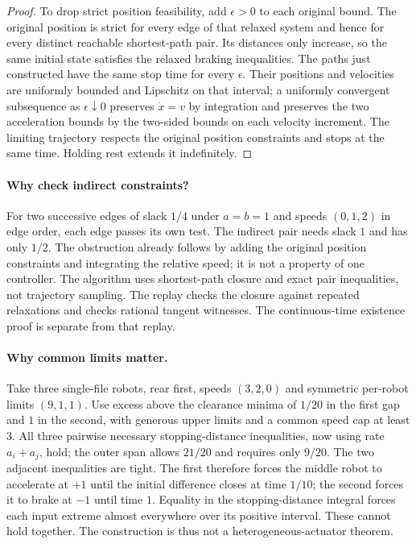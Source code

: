 \documentclass[11pt]{article}
\begin{document}
\begin{proof}
To drop strict position feasibility, add $\epsilon>0$ to each original bound. The original position is strict for every edge of that relaxed system and hence for every distinct reachable shortest-path pair. Its distances only increase, so the same initial state satisfies the relaxed braking inequalities. The paths just constructed have the same stop time for every $\epsilon$. Their positions and velocities are uniformly bounded and Lipschitz on that interval; a uniformly convergent subsequence as $\epsilon\downarrow0$ preserves $\dot x=v$ by integration and preserves the two acceleration bounds by the two-sided bounds on each velocity increment. The limiting trajectory respects the original position constraints and stops at the same time. Holding rest extends it indefinitely.
\end{proof}

\paragraph{Why check indirect constraints?}
For two successive edges of slack $1/4$ under $a=b=1$ and speeds $(0,1,2)$ in edge order, each edge passes its own test. The indirect pair needs slack $1$ and has only $1/2$. The obstruction already follows by adding the original position constraints and integrating the relative speed; it is not a property of one controller. The algorithm uses shortest-path closure and exact pair inequalities, not trajectory sampling. The replay checks the closure against repeated relaxations and checks rational tangent witnesses. The continuous-time existence proof is separate from that replay.

\paragraph{Why common limits matter.}
Take three single-file robots, rear first, speeds $(3,2,0)$ and symmetric per-robot limits $(9,1,1)$. Use excess above the clearance minima of $1/20$ in the first gap and $1$ in the second, with generous upper limits and a common speed cap at least $3$. All three pairwise necessary stopping-distance inequalities, now using rate $a_i+a_j$, hold; the outer span allows $21/20$ and requires only $9/20$. The two adjacent inequalities are tight. The first therefore forces the middle robot to accelerate at $+1$ until the initial difference closes at time $1/10$; the second forces it to brake at $-1$ until time $1$. Equality in the stopping-distance integral forces each input extreme almost everywhere over its positive interval. These cannot hold together. The construction is thus not a heterogeneous-actuator theorem.
\end{document}
